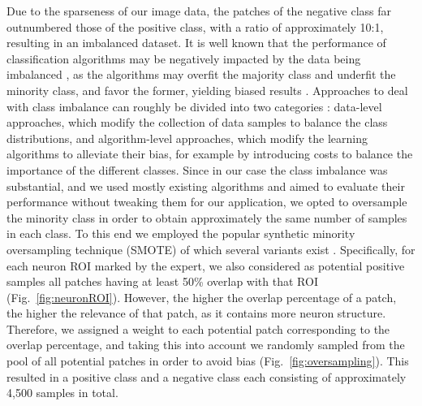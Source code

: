 Due to the sparseness of our image data, the patches of the negative class far outnumbered those of the positive class, with a ratio of approximately 10:1, resulting in an imbalanced dataset. It is well known that the performance of classification algorithms may be negatively impacted by the data being imbalanced \cite{chawla2004editorial, daskalaki2006evaluation, forman2010apples, branco2016survey}, as the algorithms may overfit the majority class and underfit the minority class, and favor the former, yielding biased results \cite{garcia2014bias, li2018adaptive}. Approaches to deal with class imbalance can roughly be divided into two categories \cite{he2008learning, Krawczyk-2016, Haixiang-2017}: data-level approaches, which modify the collection of data samples to balance the class distributions, and algorithm-level approaches, which modify the learning algorithms to alleviate their bias, for example by introducing costs to balance the importance of the different classes. Since in our case the class imbalance was substantial, and we used mostly existing algorithms and aimed to evaluate their performance without tweaking them for our application, we opted to oversample the minority class in order to obtain approximately the same number of samples in each class. To this end we employed the popular synthetic minority oversampling technique (SMOTE) \cite{Chawla:2002:SSM:1622407.1622416} of which several variants exist \cite{Saez2015, Krawczyk-2016, Gosain2017}. Specifically, for each neuron ROI marked by the expert, we also considered as potential positive samples all patches having at least 50\% overlap with that ROI (Fig.~\ref{fig:neuronROI}). However, the higher the overlap percentage of a patch, the higher the relevance of that patch, as it contains more neuron structure. Therefore, we assigned a weight to each potential patch corresponding to the overlap percentage, and taking this into account we randomly sampled from the pool of all potential patches in order to avoid bias (Fig.~\ref{fig:oversampling}). This resulted in a positive class and a negative class each consisting of approximately 4,500 samples in total.

